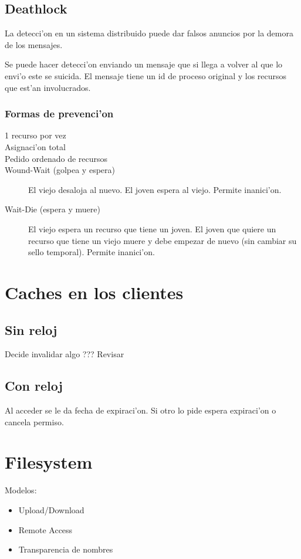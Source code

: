 \documentclass[a4paper,spanish]{article}
\begin{document}
\subsection{Deathlock}
La detecci'on en un sistema distribuido puede dar falsos anuncios por la demora
de los mensajes.

Se puede hacer detecci'on enviando un mensaje que si llega a volver al que lo
envi'o este se suicida. El mensaje tiene un id de proceso original y los
recursos que est'an involucrados.

\subsubsection{Formas de prevenci'on}
\begin{description}
	\item[1 recurso por vez]
	\item[Asignaci'on total]
	\item[Pedido ordenado de recursos]
	\item[Wound-Wait (golpea y espera)] El viejo desaloja al nuevo. El
joven espera al viejo. Permite inanici'on.
	\item[Wait-Die (espera y muere)] El viejo espera un recurso que tiene
un joven. El joven que quiere un recurso que tiene un viejo muere y debe
empezar de nuevo (sin cambiar su sello temporal). Permite inanici'on.
\end{description}

\section{Caches en los clientes}
\subsection{Sin reloj}
Decide invalidar algo ??? Revisar

\subsection{Con reloj}
Al acceder se le da fecha de expiraci'on. Si otro lo pide espera expiraci'on o
cancela permiso.
	
\section{Filesystem}
Modelos:
\begin{itemize}
	\item Upload/Download
	\item Remote Access
	\item Transparencia de nombres
\end{itemize}
\end{document}
